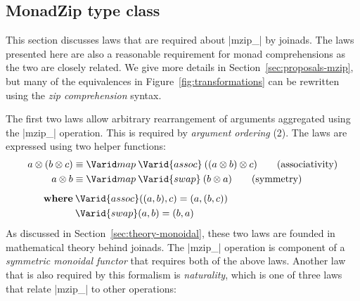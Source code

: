 \documentclass{sigplanconf}
\begin{document}
\subsection{MonadZip type class}
\label{sec:laws-monadzip}
This section discusses laws that are required about |mzip_| by joinads. The laws 
presented here are also a reasonable requirement for monad comprehensions as the two are closely
related. We give more details in Section~\ref{sec:proposals-mzip}, but many of the equivalences in 
Figure~\ref{fig:transformations} can be rewritten using the \textit{zip comprehension} syntax. 

The first two laws allow arbitrary rearrangement of arguments aggregated using the |mzip_| operation.
This is required by \textit{argument ordering} (2). The laws are expressed using two helper functions:
\begin{align*}
  a \mzip (b \mzip c) &\equiv \map \: \Varid{assoc} \: ((a \mzip b) \mzip c) \tag{associativity} \\
  a \mzip b &\equiv \map \: \Varid{swap} \: (b \mzip a) \tag{symmetry} \\
\\[-10pt]
  \textbf{where} & \: \Varid{assoc}((a,b), c) = (a,(b,c))\\
                 & \: \Varid{swap}(a,b) = (b,a)
\end{align*}
As discussed in Section~\ref{sec:theory-monoidal}, these two laws are founded in mathematical theory 
behind joinads. The |mzip_| operation is component of a \textit{symmetric monoidal functor} that requires 
both of the above laws. Another law that is also required by this formalism is \textit{naturality}, which 
is one of three laws that relate |mzip_| to other operations:
\end{document}
